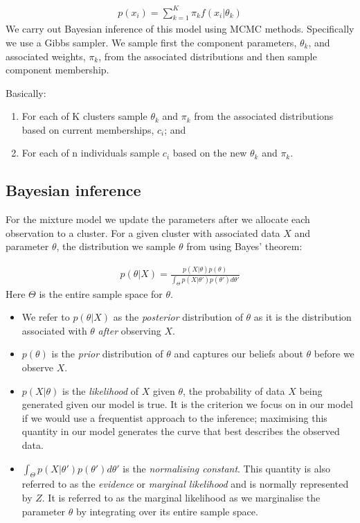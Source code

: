 \documentclass[11pt]{article} %
\begin{document}
	\begin{align}
	p(x_i) = \sum_{k=1}^K \pi_k f(x_i | \theta_k)
	\end{align}
	We carry out Bayesian inference of this model using MCMC methods. Specifically we use a Gibbs sampler. We sample first the component parameters, $\theta_k$, and associated weights, $\pi_k$, from the associated distributions and then sample component membership.
	
	Basically:
	\begin{enumerate}
		\item For each of K clusters sample $\theta_k$ and $\pi_k$ from the associated distributions based on current memberships, $c_i$; and
		\item For each of n individuals sample $c_i$ based on the new $\theta_k$ and $\pi_k$.
	\end{enumerate}

	\subsection{Bayesian inference}	
	For the mixture model we update the parameters after we allocate each observation to a cluster. For a given cluster with associated data $X$ and parameter $\theta$, the distribution we sample $\theta$ from using Bayes' theorem:
	
	\begin{align} \label{Bayes_theorem}
	p(\theta | X) = \frac{p(X | \theta) p(\theta)}{\int_\Theta p(X | \theta ') p(\theta ') d \theta '}
	\end{align}
	Here $\Theta$ is the entire sample space for $\theta$. 
	\begin{itemize}
		\item We refer to $p(\theta | X)$ as the \emph{posterior} distribution of $\theta$ as it is the distribution associated with $\theta$ \emph{after} observing $X$.
		\item $p(\theta)$ is the \emph{prior} distribution of $\theta$ and captures our beliefs about $\theta$ before we observe $X$.
		\item $p(X | \theta)$ is the \emph{likelihood} of $X$ given $\theta$, the probability of data $X$ being generated given our model is true. It is the criterion we focus on in our model if we would use a frequentist approach to the inference; maximising this quantity in our model generates the curve that best describes the observed data. 
		\item $\int_\Theta p(X | \theta ') p(\theta ') d \theta '$ is the \emph{normalising constant}. This quantity is also referred to as the \emph{evidence} \cite{mackay_information_2003} or \emph{marginal likelihood} and is normally represented by $Z$. It is referred to as the marginal likelihood as we marginalise the parameter $\theta$ by integrating over its entire sample space.
	\end{itemize}
	
\end{document}

